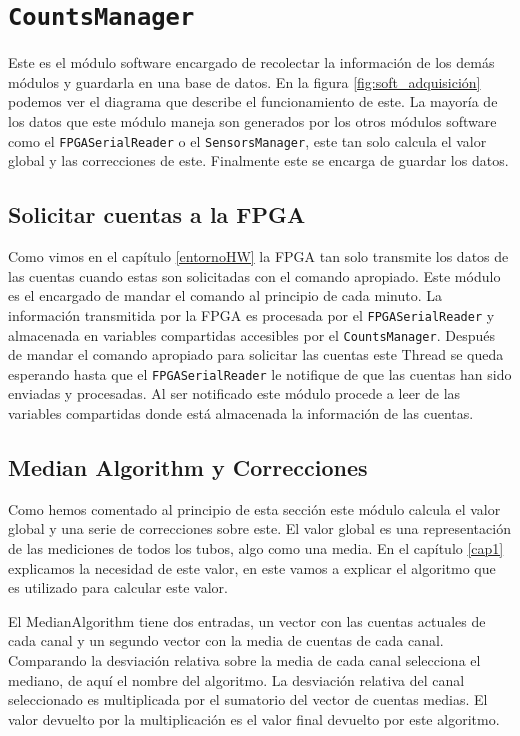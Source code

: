 \section{\texttt{CountsManager}}
	Este es el módulo software encargado de recolectar la información de los demás módulos y guardarla en una base de datos. En la figura 
	\ref{fig:soft_adquisición} podemos ver el diagrama que describe el funcionamiento de este. La mayoría de los datos que este módulo maneja son
	generados por los otros módulos software como el \texttt{FPGASerialReader} o el \texttt{SensorsManager}, este tan solo calcula el valor global
	y las correcciones de este. Finalmente este se encarga de guardar los datos. 
	\subsection{Solicitar cuentas a la FPGA}
		Como vimos en el capítulo \ref{entornoHW} la FPGA tan solo transmite los datos de las cuentas cuando estas son solicitadas con el
		comando apropiado. Este módulo es el encargado de mandar el comando al principio de cada minuto. La información transmitida por la
		FPGA es procesada por el \texttt{FPGASerialReader} y almacenada en variables compartidas accesibles por el \texttt{CountsManager}.
		Después de mandar el comando apropiado para solicitar las cuentas este Thread se queda esperando hasta que el \texttt{FPGASerialReader}
		le notifique de que las cuentas han sido enviadas y procesadas. Al ser notificado este módulo procede a leer de las variables
		compartidas donde está almacenada la información de las cuentas.
	\subsection{Median Algorithm y Correcciones}
		Como hemos comentado al principio de esta sección este módulo calcula el valor global y una serie de correcciones sobre este. El valor
		global es una representación de las mediciones de todos los tubos, algo como una media. En el capítulo \ref{cap1} explicamos la
		necesidad de este valor, en este vamos a explicar el algoritmo que es utilizado para calcular este valor.
	  	\par 
		El MedianAlgorithm\cite{MedianAlgr} tiene dos entradas, un vector con las cuentas actuales de cada canal y un segundo vector con la
		media de cuentas de cada canal. Comparando la desviación relativa sobre la media de cada canal selecciona el mediano, de aquí el
		nombre del algoritmo. La desviación relativa del canal seleccionado es multiplicada por el sumatorio del vector de cuentas medias.
		El valor devuelto por la multiplicación es el valor final devuelto por este algoritmo. 
